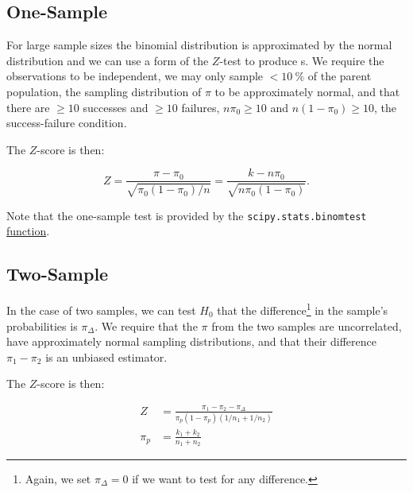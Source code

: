 \subsection{One-Sample}
\label{hypo:binomial_test:one}

For large sample sizes the binomial distribution is approximated by the normal distribution
and we can use a form of the $Z$-test to produce {\pvalue}s.
We require the observations to be independent,
\ie we may only sample $< \SI{10}{\percent}$ of the parent population,
the sampling distribution of $\pi$ to be approximately normal,
and that there are $\geq 10$ successes and $\geq 10$ failures,
$n \pi_{0} \geq 10$ and $n \left(1-\pi_{0}\right) \geq 10$, \ie the success-failure condition.

The $Z$-score is then:

\begin{equation}\label{eq:hypo:binomial_test:one}
Z = \frac{\pi - \pi_{0}}{\sqrt{\pi_{0}\left(1-\pi_{0}\right)/n}} = \frac{k - n \pi_{0}}{\sqrt{n\pi_{0}\left(1-\pi_{0}\right)}}.
\end{equation}

Note that the one-sample test is provided by the
\texttt{scipy.stats.binomtest} \href{https://docs.scipy.org/doc/scipy/reference/generated/scipy.stats.binomtest.html}{function}.

\subsection{Two-Sample}
\label{hypo:binomial_test:two}

In the case of two samples, we can test $H_{0}$
that the difference\footnote{Again, we set $\pi_{\Delta} = 0$ if we want to test for any difference.} in the sample's probabilities is $\pi_{\Delta}$.
We require that the $\pi$ from the two samples are uncorrelated,
have approximately normal sampling distributions,
and that their difference $\pi_{1} - \pi_{2}$ is an unbiased estimator.

The $Z$-score is then:

\begin{subequations}\label{eq:hypo:binomial_test:two}
\begin{align}
Z &= \frac{\pi_{1} - \pi_{2} - \pi_{\Delta}}{\pi_{p} \left(1-\pi_{p}\right)\left(1/n_{1} + 1/n_{2}\right)} \label{eq:hypo:binomial_test:two:Z} \\
\pi_{p} &= \frac{k_{1} + k_{2}}{n_{1} + n_{2}} \label{eq:hypo:binomial_test:two:pi_p}
\end{align}
\end{subequations}

